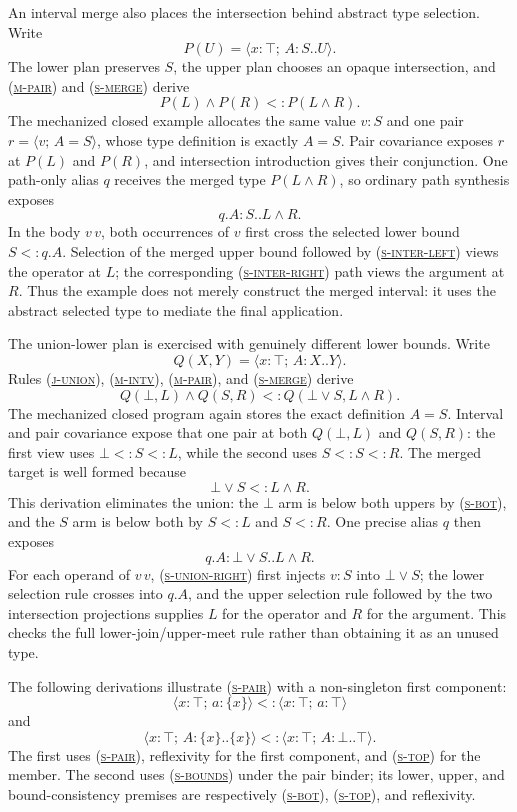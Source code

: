 \documentclass[acmsmall,screen,nonacm]{acmart}
\newcommand{\ruleref}[1]{%
  \textsc{(\hyperref[rule:#1]{#1})}}
\newcommand{\sing}[1]{\{#1\}}
\newcommand{\pairty}[4]{\langle #1\!:\!#2;\,#3\!:\!#4\rangle}
\newcommand{\interty}[2]{#1\mathbin{\wedge}#2}
\newcommand{\unionty}[2]{#1\mathbin{\vee}#2}
\newcommand{\pairval}[3]{\langle #1;\,#2=#3\rangle}
\begin{document}
An interval merge also places the intersection behind abstract type selection.
Write
\[
  P(U)=\pairty{x}{\top}{A}{S..U}.
\]
The lower plan preserves \(S\), the upper plan chooses an opaque intersection,
and \ruleref{m-pair} and \ruleref{s-merge} derive
\[
  \interty{P(L)}{P(R)}<:P(\interty{L}{R}).
\]
The mechanized closed example allocates the same value \(v:S\) and one pair
\(r=\pairval{v}{A}{S}\), whose type definition is exactly \(A=S\). Pair
covariance exposes \(r\) at \(P(L)\) and \(P(R)\), and intersection
introduction gives their conjunction. One path-only alias \(q\) receives the
merged type \(P(\interty{L}{R})\), so ordinary path synthesis exposes
\[
  q.A:S..\interty{L}{R}.
\]
In the body \(v\,v\), both occurrences of \(v\) first cross the selected
lower bound \(S<:q.A\). Selection of the merged upper bound followed by
\ruleref{s-inter-left} views the operator at \(L\); the corresponding
\ruleref{s-inter-right} path views the argument at \(R\). Thus the example
does not merely construct the merged interval: it uses the abstract selected
type to mediate the final application.

The union-lower plan is exercised with genuinely different lower bounds. Write
\[
  Q(X,Y)=\pairty{x}{\top}{A}{X..Y}.
\]
Rules \ruleref{j-union}, \ruleref{m-intv}, \ruleref{m-pair}, and
\ruleref{s-merge} derive
\[
  \interty{Q(\bot,L)}{Q(S,R)}
  <:
  Q(\unionty{\bot}{S},\interty{L}{R}).
\]
The mechanized closed program again stores the exact definition \(A=S\).
Interval and pair covariance expose that one pair at both \(Q(\bot,L)\) and
\(Q(S,R)\): the first view uses \(\bot<:S<:L\), while the second uses
\(S<:S<:R\). The merged target is well formed because
\[
  \unionty{\bot}{S}<:\interty{L}{R}.
\]
This derivation eliminates the union: the \(\bot\) arm is below both uppers by
\ruleref{s-bot}, and the \(S\) arm is below both by \(S<:L\) and \(S<:R\).
One precise alias \(q\) then exposes
\[
  q.A:\unionty{\bot}{S}..\interty{L}{R}.
\]
For each operand of \(v\,v\), \ruleref{s-union-right} first injects
\(v:S\) into \(\unionty{\bot}{S}\); the lower selection rule crosses into
\(q.A\), and the upper selection rule followed by the two intersection
projections supplies \(L\) for the operator and \(R\) for the argument. This
checks the full lower-join/upper-meet rule rather than obtaining it as an
unused type.

The following derivations illustrate \ruleref{s-pair} with a non-singleton
first component:
\[
  \pairty{x}{\top}{a}{\sing{x}}
  <:
  \pairty{x}{\top}{a}{\top}
\]
and
\[
  \pairty{x}{\top}{A}{\sing{x}..\sing{x}}
  <:
  \pairty{x}{\top}{A}{\bot..\top}.
\]
The first uses \ruleref{s-pair}, reflexivity for the first component, and
\ruleref{s-top} for the member. The second uses \ruleref{s-bounds} under the
pair binder; its lower, upper, and bound-consistency premises are respectively
\ruleref{s-bot}, \ruleref{s-top}, and reflexivity.
\end{document}
